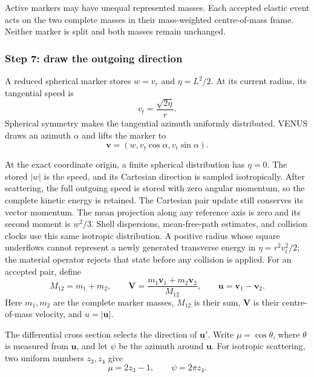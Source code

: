 Active markers may have unequal represented masses.  Each accepted elastic
event acts on the two complete masses in their mass-weighted centre-of-mass
frame.  Neither marker is split and both masses remain unchanged.

\subsubsection{Step 7: draw the outgoing direction}

A reduced spherical marker stores \(w=v_r\) and \(\eta=L^2/2\).  At its
current radius, its tangential speed is
\[
 v_t=\frac{\sqrt{2\eta}}{r}.                            \tag{PIC20}
\]
Spherical symmetry makes the tangential azimuth uniformly distributed.
VENUS draws an azimuth \(\alpha\) and lifts the marker to
\[
 \bm v=(w,v_t\cos\alpha,v_t\sin\alpha).                \tag{PIC21}
\]

At the exact coordinate origin, a finite spherical distribution has
\(\eta=0\). The stored \(|w|\) is the speed, and its Cartesian direction
is sampled isotropically. After scattering, the full outgoing speed is
stored with zero angular momentum, so the complete kinetic energy is
retained. The Cartesian pair update still conserves its vector momentum.
The mean projection along any reference axis is zero and its second moment
is \(w^2/3\). Shell dispersions, mean-free-path estimates, and collision
clocks use this same isotropic distribution. A positive radius whose square
underflows cannot represent a newly generated transverse energy in
\(\eta=r^2v_t^2/2\); the material operator rejects that state before any
collision is applied.
For an accepted pair, define
\[
 M_{12}=m_1+m_2,\qquad
 \bm V=\frac{m_1\bm v_1+m_2\bm v_2}{M_{12}},
 \qquad \bm u=\bm v_1-\bm v_2.                         \tag{PIC22}
\]
Here \(m_1,m_2\) are the complete marker masses, \(M_{12}\) is their sum,
\(\bm V\) is their centre-of-mass velocity, and \(u=|\bm u|\).

The differential cross section selects the direction of \(\bm u'\).  Write
\(\mu=\cos\theta\), where \(\theta\) is measured from \(\bm u\), and let
\(\psi\) be the azimuth around \(\bm u\).  For isotropic scattering, two
uniform numbers \(z_3,z_4\) give
\[
 \mu=2z_3-1,
 \qquad \psi=2\pi z_4.                                 \tag{PIC23}
\]

